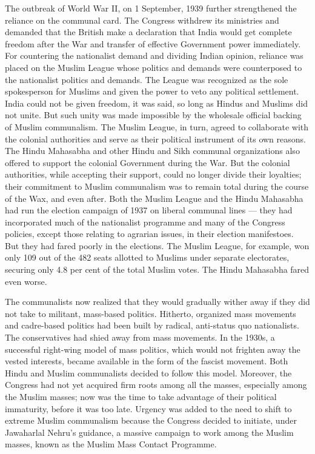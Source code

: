\begin{multicols}{2}
The outbreak of World War II, on 1 September, 1939 further strengthened the reliance on the communal card. The Congress withdrew its ministries and demanded that the British make a declaration that India would get complete freedom after the War and transfer of effective Government power immediately. For countering the nationalist demand and dividing Indian opinion, reliance was placed on the Muslim League whose politics and demands were counterposed to the nationalist politics and demands. The League was recognized as the sole spokesperson for Muslims and given the power to veto any political settlement. India could not be given freedom, it was said, so long as Hindus and Muslims did not unite. But such unity was made impossible by the wholesale official backing of Muslim communalism. The Muslim League, in turn, agreed to collaborate with the colonial authorities and serve as their political instrument of its own reasons. The Hindu Mahasabha and other Hindu and Sikh communal organizations also offered to support the colonial Government during the War. But the colonial authorities, while accepting their support, could no longer divide their loyalties; their commitment to Muslim communalism was to remain total during the course of the Wax, and even after. Both the Muslim League and the Hindu Mahasabha had run the election campaign of 1937 on liberal communal lines --- they had incorporated much of the nationalist programme and many of the Congress policies, except those relating to agrarian issues, in their election manifestoes. But they had fared poorly in the elections. The Muslim League, for example, won only 109 out of the 482 seats allotted to Muslims under separate electorates, securing only 4.8 per cent of the total Muslim votes. The Hindu Mahasabha fared even worse. 

The communalists now realized that they would gradually wither away if they did not take to militant, mass-based politics. Hitherto, organized mass movements and cadre-based politics had been built by radical, anti-status quo nationalists. The conservatives had shied away from mass movements. In the 1930s, a successful right-wing model of mass politics, which would not frighten away the vested interests, became available in the form of the fascist movement. Both Hindu and Muslim communalists decided to follow this model. Moreover, the Congress had not yet acquired firm roots among all the masses, especially among the Muslim masses; now was the time to take advantage of their political immaturity, before it was too late. Urgency was added to the need to shift to extreme Muslim communalism because the Congress decided to initiate, under Jawaharlal Nehru's guidance, a massive campaign to work among the Muslim masses, known as the Muslim Mass Contact Programme. 


\end{multicols}
